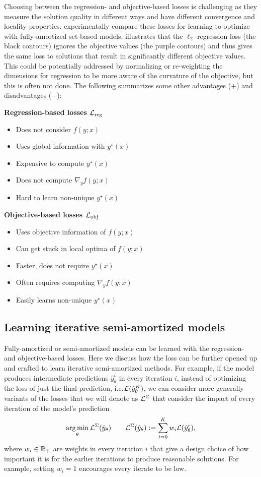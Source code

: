 \documentclass[twoside,11pt]{article}
\newcommand{\ie}{i.e.\xspace}
\newcommand\pro{\item[$+$]}
\newcommand\con{\item[$-$]}
\begin{document}
Choosing between the regression- and objective-based losses
is challenging as they measure the solution quality in
different ways and have different convergence and
locality properties.
\citet{liu2022teaching} experimentally compare these
losses for learning to optimize with fully-amortized set-based models.
 illustrates that the $\ell_2$-regression
loss (the black contours) ignores the objective
values (the purple contours) and thus gives the same loss
to solutions that result in significantly different
objective values.
This could be potentially addressed by normalizing or
re-weighting the dimensions for regression to be more aware
of the curvature of the objective, but this is often not done.
The following summarizes some other advantages ($+$) and
disadvantages ($-$):
\vspace{2mm}

\noindent
\begin{minipage}[t]{0.5\textwidth}
\noindent\textbf{Regression-based losses ${\mathcal{L}}_{\rm reg}$}
\begin{itemize}[leftmargin=*,noitemsep]
\con Does not consider $f(y; x)$
\pro Uses global information with $y^\star(x)$
\con Expensive to compute $y^\star(x)$
\pro Does not compute $\nabla_y f(y; x)$
\con Hard to learn non-unique $y^\star(x)$
\end{itemize}
\end{minipage}
\begin{minipage}[t]{0.5\textwidth}
\textbf{Objective-based losses ${\mathcal{L}}_{\rm obj}$}
\begin{itemize}[leftmargin=*,noitemsep]
\pro Uses objective information of $f(y; x)$
\con Can get stuck in local optima of $f(y; x)$
\pro Faster, does not require $y^\star(x)$
\con Often requires computing $\nabla_y f(y; x)$
\pro Easily learns non-unique $y^\star(x)$
\end{itemize}
\end{minipage}

\subsection{Learning iterative semi-amortized models}
\label{sec:learning:iter}

Fully-amortized or semi-amortized models can be learned
with the regression- and objective-based losses.
Here we discuss how the loss can be further opened up
and crafted to learn iterative semi-amortized methods.
For example, if the model produces intermediate predictions
$\hat y_\theta^i$ in every iteration $i$, instead of
optimizing the loss of just the final prediction,
\ie ${\mathcal{L}}(\hat y_\theta^K)$, we can consider more generally
variants of the losses that we will denote as
${\mathcal{L}}^\Sigma$ that consider the impact of every iteration
of the model's prediction
\begin{equation}
  \operatorname*{arg\,min}_\theta {\mathcal{L}}^\Sigma(\hat y_\theta) \qquad {\mathcal{L}}^\Sigma(\hat y_\theta) \vcentcolon= \sum_{i=0}^K w_i {\mathcal{L}}(\hat y_\theta^i),
\label{eq:iter-loss}
\end{equation}
where $w_i\in\mathbb{R}_+$ are weights in every iteration $i$
that give a design choice of how important
it is for the earlier iterations to produce reasonable
solutions.
For example, setting $w_i=1$ encourages every iterate
to be low.
\end{document}
